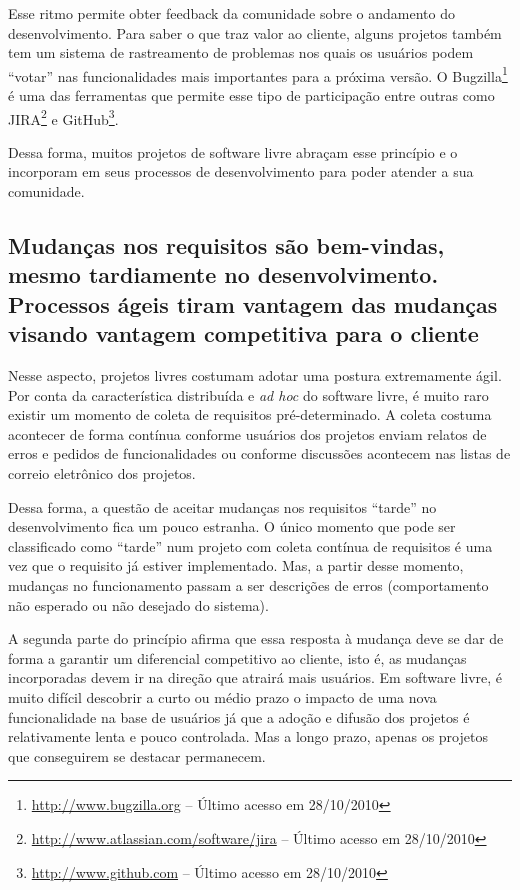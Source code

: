 Esse ritmo permite obter feedback da comunidade sobre o andamento do
desenvolvimento. Para saber o que traz valor ao cliente, alguns
projetos também tem um sistema de rastreamento de problemas nos quais
os usuários podem ``votar'' nas funcionalidades mais importantes para
a próxima versão. O Bugzilla\footnote{\url{http://www.bugzilla.org} --
  Último acesso em 28/10/2010} é uma das ferramentas que permite esse
tipo de participação entre outras como
JIRA\footnote{\url{http://www.atlassian.com/software/jira} -- Último
  acesso em 28/10/2010} e GitHub\footnote{\url{http://www.github.com}
  -- Último acesso em 28/10/2010}.

Dessa forma, muitos projetos de software livre abraçam esse princípio
e o incorporam em seus processos de desenvolvimento para poder atender
a sua comunidade.

\subsection[Aceitar as mudanças]{Mudanças nos requisitos são
  bem-vindas, mesmo tardiamente no desenvolvimento.  Processos ágeis
  tiram vantagem das mudanças visando vantagem competitiva para o
  cliente}

Nesse aspecto, projetos livres costumam adotar uma postura
extremamente ágil. Por conta da característica distribuída e
\textit{ad hoc} do software livre, é muito raro existir um momento de
coleta de requisitos pré-determinado. A coleta costuma acontecer de
forma contínua conforme usuários dos projetos enviam relatos de erros
e pedidos de funcionalidades ou conforme discussões acontecem nas
listas de correio eletrônico dos projetos.

Dessa forma, a questão de aceitar mudanças nos requisitos ``tarde'' no
desenvolvimento fica um pouco estranha. O único momento que pode ser
classificado como ``tarde'' num projeto com coleta contínua de
requisitos é uma vez que o requisito já estiver implementado. Mas, a
partir desse momento, mudanças no funcionamento passam a ser
descrições de erros (comportamento não esperado ou não desejado do
sistema).

A segunda parte do princípio afirma que essa resposta à mudança deve
se dar de forma a garantir um diferencial competitivo ao cliente, isto
é, as mudanças incorporadas devem ir na direção que atrairá mais
usuários. Em software livre, é muito difícil descobrir a curto ou
médio prazo o impacto de uma nova funcionalidade na base de usuários
já que a adoção e difusão dos projetos é relativamente lenta e pouco
controlada. Mas a longo prazo, apenas os projetos que conseguirem se
destacar permanecem.

